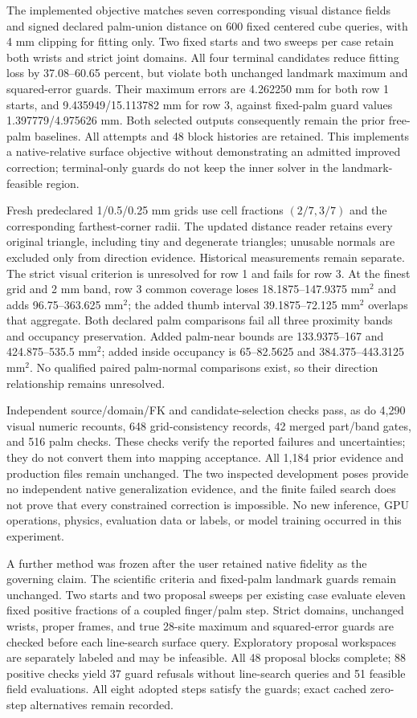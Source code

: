 \documentclass[10pt,letterpaper]{article}
\begin{document}
The implemented objective matches seven corresponding visual distance fields
and signed declared palm-union distance on 600 fixed centered cube queries,
with 4 mm clipping for fitting only. Two fixed starts and two sweeps per case
retain both wrists and strict joint domains. All four terminal candidates
reduce fitting loss by 37.08--60.65 percent, but violate both unchanged landmark
maximum and squared-error guards. Their maximum errors are 4.262250 mm for both
row 1 starts, and 9.435949/15.113782 mm for row 3, against fixed-palm guard
values 1.397779/4.975626 mm. Both selected outputs consequently remain the prior
free-palm baselines. All attempts and 48 block histories are retained. This
implements a native-relative surface objective without demonstrating an admitted
improved correction; terminal-only guards do not keep the inner solver in the
landmark-feasible region.

Fresh predeclared 1/0.5/0.25 mm grids use cell fractions $(2/7,3/7)$ and the
corresponding farthest-corner radii. The updated distance reader retains every
original triangle, including tiny and degenerate triangles; unusable normals
are excluded only from direction evidence. Historical measurements remain
separate. The strict visual criterion is unresolved for row 1 and fails for
row 3. At the finest grid and 2 mm band, row 3 common coverage loses
18.1875--147.9375 mm$^2$ and adds 96.75--363.625 mm$^2$; the added thumb interval
39.1875--72.125 mm$^2$ overlaps that aggregate. Both declared palm comparisons
fail all three proximity bands and occupancy preservation. Added palm-near
bounds are 133.9375--167 and 424.875--535.5 mm$^2$; added inside occupancy is
65--82.5625 and 384.375--443.3125 mm$^2$. No qualified paired palm-normal
comparisons exist, so their direction relationship remains unresolved.

Independent source/domain/FK and candidate-selection checks pass, as do
4,290 visual numeric recounts, 648 grid-consistency records, 42 merged part/band
gates, and 516 palm checks. These checks verify the reported failures and
uncertainties; they do not convert them into mapping acceptance. All 1,184 prior
evidence and production files remain unchanged. The two inspected development
poses provide no independent native generalization evidence, and the finite
failed search does not prove that every constrained correction is impossible.
No new inference, GPU operations, physics, evaluation data or labels, or model
training occurred in this experiment.

A further method was frozen after the user retained native fidelity as the
governing claim. The scientific criteria and fixed-palm landmark guards remain
unchanged. Two starts and two proposal sweeps per existing case evaluate eleven
fixed positive fractions of a coupled finger/palm step. Strict domains,
unchanged wrists, proper frames, and true 28-site maximum and squared-error
guards are checked before each line-search surface query. Exploratory proposal
workspaces are separately labeled and may be infeasible. All 48 proposal blocks
complete; 88 positive checks yield 37 guard refusals without line-search queries
and 51 feasible field evaluations. All eight adopted steps satisfy the guards;
exact cached zero-step alternatives remain recorded.
\end{document}
